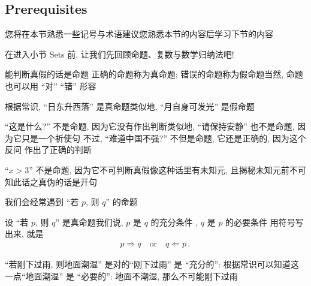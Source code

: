\subsection*{Prerequisites}

您将在本节熟悉一些记号与术语\period 建议您熟悉本节的内容后学习下节的内容\period

在进入小节 Sets 前, 让我们先回顾命题、复数与数学归纳法吧!

\begin{definition}
    能判断真假的话是命题 \period 正确的命题称为真命题; 错误的命题称为假命题\period 当然, 命题也可以用 ``对'' ``错'' 形容\period
\end{definition}

\begin{example}
    根据常识, ``日东升西落'' 是真命题\period 类似地, ``月自身可发光'' 是假命题\period

    ``这是什么?'' 不是命题, 因为它没有作出判断\period 类似地, ``请保持安静'' 也不是命题, 因为它只是一个祈使句 \period 不过, ``难道中国不强?'' 不但是命题, 它还是正确的, 因为这个反问  作出了正确的判断\period

    ``$x > 3$'' 不是命题, 因为它不可判断真假\period 像这种话里有未知元, 且揭秘未知元前不可知此话之真伪的话是开句 \period
\end{example}

我们会经常遇到 ``若 $p$, 则 $q$'' 的命题\period

\begin{definition}
    设 ``若 $p$, 则 $q$'' 是真命题\period 我们说, $p$ 是 $q$ 的充分条件 , $q$ 是 $p$ 的必要条件 \period 用符号写出来, 就是
    \begin{align*}
        p \Rightarrow q \quad \text{or} \quad q \Leftarrow p \period
    \end{align*}
\end{definition}

\begin{example}
    ``若刚下过雨, 则地面潮湿'' 是对的\period ``刚下过雨'' 是 ``充分的'': 根据常识可以知道这一点\period ``地面潮湿'' 是 ``必要的'': 地面不潮湿, 那么不可能刚下过雨\period
\end{example}

